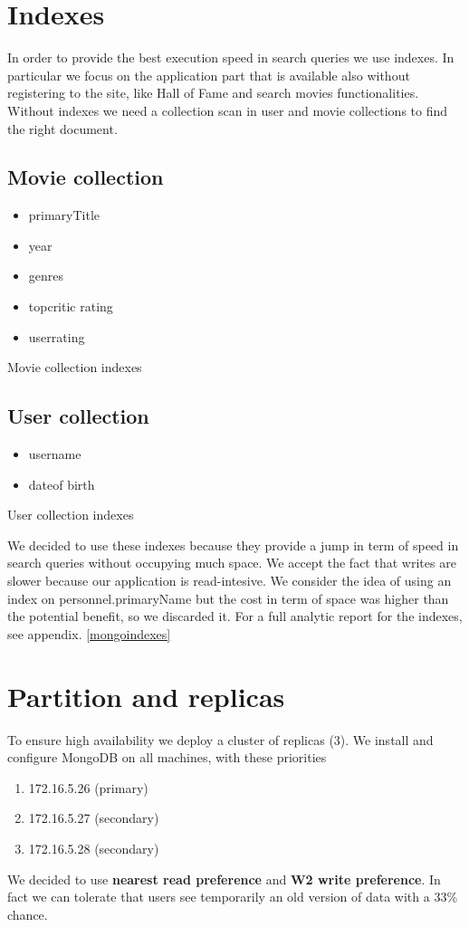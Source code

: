 \section{Indexes}
In order to provide the best execution speed in search queries we use indexes. In particular we focus on the application part that is available also without registering to the site, like Hall of Fame and search movies functionalities. Without indexes we need a collection scan in user and movie collections to find the right document. \\
\subsection{Movie collection}
\begin{itemize}
\item primaryTitle
\item year
\item genres
\item top\textunderscore critic \textunderscore rating
\item user\textunderscore rating
\end{itemize}

\caption{Movie collection indexes}
\subsection{User collection}
\begin{itemize}
\item username
\item date\textunderscore of \textunderscore birth
\end{itemize}

\caption{User collection indexes}

We decided to use these indexes because they provide a jump in term of speed in search queries without occupying much space. We accept the fact that writes are slower because our application is read-intesive. We consider the idea of using an index on personnel.primaryName but the cost in term of space was higher than the potential benefit, so we discarded it.
For a full analytic report for the indexes, see appendix. \cref{mongoindexes}
\section{Partition and replicas}
To ensure high availability we deploy a cluster of replicas (3). We install and configure MongoDB on all machines, with these priorities 
\begin{enumerate}
 \item 172.16.5.26 (primary)
 \item 172.16.5.27 (secondary)
 \item 172.16.5.28 (secondary)
 \end{enumerate} 
We decided to use \textbf{nearest read preference} and \textbf{W2 write preference}. In fact we can tolerate that users see temporarily an old version of data with a 33\% chance. 

